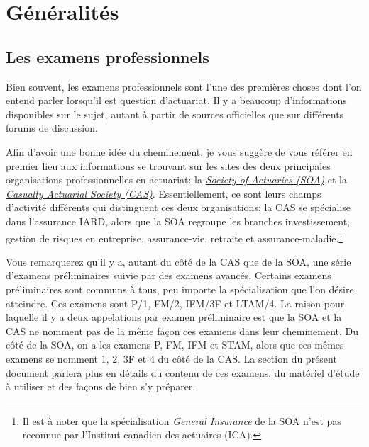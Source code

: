 \section*{Généralités}
\label{sec:generalites}

\subsection*{Les examens professionnels}
\label{subsec:examsprofs}
\captionsetup{justification=centering}
Bien souvent, les examens professionnels sont l'une des premières choses dont l'on entend parler lorsqu'il est question d'actuariat. Il y a beaucoup d'informations disponibles sur le sujet, autant à partir de sources officielles que sur différents forums de discussion.\vspace{\baselineskip}

Afin d'avoir une bonne idée du cheminement, je vous suggère de vous référer en premier lieu aux informations se trouvant sur les sites des deux principales organisations professionnelles en actuariat: la \href{https://soa.org/member/}{\emph{Society of Actuaries (SOA)}} et la \href{http://www.casact.org/}{\emph{Casualty Actuarial Society (CAS)}}. Essentiellement, ce sont leurs champs d'activité différents qui distinguent ces deux organisations; la CAS se spécialise dans l'assurance IARD, alors que la SOA regroupe les branches investissement, gestion de risques en entreprise, assurance-vie, retraite et assurance-maladie.\footnote{ Il est à noter que la spécialisation \emph{General Insurance} de la SOA n'est pas reconnue par l'Institut canadien des actuaires (ICA).}\vspace{\baselineskip}

Vous remarquerez qu'il y a, autant du côté de la CAS que de la SOA, une série d'examens préliminaires suivie par des examens avancés. Certains examens préliminaires sont communs à tous, peu importe la spécialisation que l'on désire atteindre. Ces examens sont P/1, FM/2, IFM/3F et LTAM/4. La raison pour laquelle il y a deux appelations par examen préliminaire est que la SOA et la CAS ne nomment pas de la même façon ces examens dans leur cheminement. Du côté de la SOA, on a les examens P, FM, IFM et STAM, alors que ces mêmes examens se nomment 1, 2, 3F et 4 du côté de la CAS. La section  du présent document parlera plus en détails du contenu de ces examens, du matériel d'étude à utiliser et des façons de bien s'y préparer.\vspace{\baselineskip}

